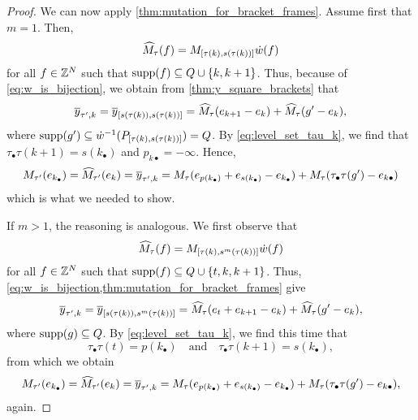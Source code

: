 \begin{proof}
	We can now apply \cref{thm:mutation_for_bracket_frames}. Assume first that $m = 1$.
	Then,
	\begin{equation*}
		\widehat{M}_\tau(f) = M_{[\tau(k), s(\tau(k))]}\dot{w}(f)
	\end{equation*}
	for all $f \in \mathbb{Z}^N$ such that $\operatorname{supp}(f) \subseteq Q \cup \{k, k+1\}$. Thus, because of \cref{eq:w_is_bijection}, we obtain from \cref{thm:y_square_brackets} that
	\begin{equation*}
		\overline{y}_{\tau', k} = \overline{y}_{[s(\tau(k)), s(\tau(k))]} = \widehat{M}_\tau(e_{k+1} - e_k) + \widehat{M}_{\tau}(g' - e_k),
	\end{equation*}
	where $\operatorname{supp}(g') \subseteq \dot{w}^{-1}(P_{[\tau(k), s(\tau(k))]}) = Q$. By
	\cref{eq:level_set_tau_k}, we find that $\tau_\bullet\tau(k+1) = s(k_\bullet)$ and
	$p_{k\bullet} = -\infty$. Hence,
	\begin{equation*}
		M_{\tau'}(e_{k_\bullet}) = \widehat{M}_{\tau'}(e_k) = \overline{y}_{\tau', k} = M_\tau(e_{p(k_\bullet)} + e_{s(k_\bullet)} - e_{k_\bullet}) + M_\tau(\tau_\bullet \tau(g') - e_{k\bullet})
	\end{equation*}
	which is what we needed to show.

	If $m > 1$, the reasoning is analogous. We first observe that
	\begin{equation*}
		\widehat{M}_\tau(f) = M_{[\tau(k), s^m(\tau(k))]}\dot{w}(f)
	\end{equation*}
	for all $f \in \mathbb{Z}^N$ such that $\operatorname{supp}(f) \subseteq Q \cup \{t, k , k+1\}$. Thus, \cref{eq:w_is_bijection,thm:mutation_for_bracket_frames} give
	\begin{align*}
		\overline{y}_{\tau', k} = \overline{y}_{[s(\tau(k)), s^m(\tau(k))]} = \widehat{M}_\tau(e_t + e_{k+1} - e_k) + \widehat{M}_\tau(g' - e_k),
	\end{align*}
	where $\operatorname{supp}(g) \subseteq Q$. By \cref{eq:level_set_tau_k}, we find this time that
	\begin{equation*}
		\tau_\bullet\tau(t) = p(k_\bullet) \quad \text{and} \quad \tau_\bullet\tau(k+1) = s(k_\bullet),
	\end{equation*}
	from which we obtain
	\begin{equation*}
		M_{\tau'}(e_{k_\bullet}) = \widehat{M}_{\tau'}(e_k) = \overline{y}_{\tau', k} = M_\tau(e_{p(k_\bullet)} + e_{s(k_\bullet)} - e_{k_\bullet}) + M_\tau(\tau_\bullet \tau(g') - e_{k\bullet}),
	\end{equation*}
	again.


\end{proof}
